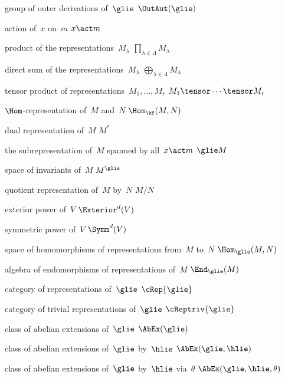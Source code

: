 {group of outer derivations of~$\glie$}
{$\OutAut(\glie)$}

{action of~$x$ on~$m$}
{$x \act m$}

{product of the representations~$M_\lambda$}
{$\prod_{\lambda \in \Lambda} M_\lambda$}

{direct sum of the representations~$M_\lambda$}
{$\bigoplus_{\lambda \in \Lambda} M_\lambda$}

{tensor product of representations~$M_1, \dotsc, M_r$}
{$M_1 \tensor \dotsb \tensor M_r$}

{$\Hom$-representation of~$M$ and~$N$}
{$\Hom_{\kf}(M, N)$}

{dual representation of~$M$}
{$M^*$}

{the subrepresentation of~$M$ spanned by all~$x \act m$}
{$\glie M$}

{space of invariants of~$M$}
{$M^{\glie}$}

{quotient representation of~$M$ by~$N$}
{$M/N$}

{ exterior power of~$V$}
{$\Exterior^d(V)$}

{ symmetric power of~$V$}
{$\Symm^d(V)$}

{space of homomorphisms of representations from~$M$ to~$N$}
{$\Hom_{\glie}(M,N)$}

{algebra of endomorphisms of representations of~$M$}
{$\End_{\glie}(M)$}

{category of representations of~$\glie$}
{$\cRep{\glie}$}

{category of trivial representations of~$\glie$}
{$\cReptriv{\glie}$}

{class of abelian extensions of~$\glie$}
{$\AbEx(\glie)$}

{class of abelian extensions of~$\glie$ by~$\hlie$}
{$\AbEx(\glie, \hlie)$}

{class of abelian extensions of~$\glie$ by~$\hlie$ via~$\theta$}
{$\AbEx(\glie, \hlie, \theta)$}

